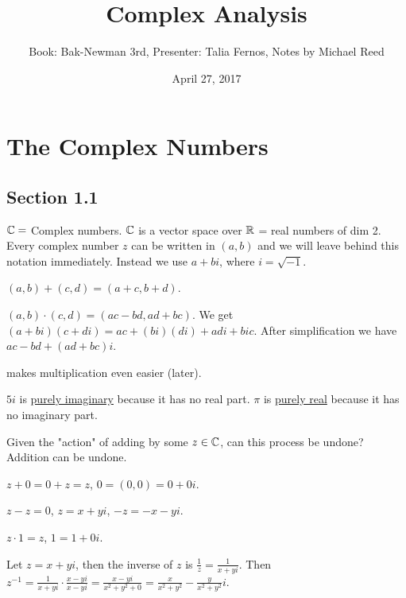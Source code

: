 \documentclass[]{article}
\author{Book: Bak-Newman 3rd, Presenter: Talia Fernos, Notes by Michael Reed}
\title{Complex Analysis}
\date{April 27, 2017}
\begin{document}
\maketitle

\section{The Complex Numbers}
\subsection{Section 1.1}
$\mathbb{C} = $ Complex numbers. $\mathbb{C}$ is a vector space over $\mathbb{R}$ = real numbers of dim 2. Every complex number $z$ can be written in  $(a,b)$ and we will leave behind this notation immediately. Instead we use $a+bi$, where $i=\sqrt{-1}$.
\begin{definition}
	[Addition] $(a,b)+(c,d)=(a+c,b+d)$.
\end{definition}
\begin{definition}
	[Multiplication] $(a,b)\cdot(c,d)=(ac-bd,ad+bc)$. We get $(a+bi)(c+di)=ac+(bi)(di)+adi+bic$. After simplification we have $ac-bd+(ad+bc)i$.
\end{definition}
\begin{definition}
	 makes multiplication even easier (later).
\end{definition}
\begin{example}
	$5i$ is \underline{purely imaginary} because it has no real part. $\pi$ is \underline{purely real} because it has no imaginary part.
\end{example}
\begin{example}
	Given the "action" of adding by some $z\in\mathbb{C}$, can this process be undone? Addition can be undone.%
\end{example}
\begin{definition}
	 $z+0=0+z=z$, $0=(0,0)=0+0i$.
\end{definition}
\begin{definition}
	 $z-z=0$, $z=x+yi$, $-z=-x-yi$.
\end{definition}
\begin{definition}
	 $z\cdot1=z$, $1=1+0i$.
\end{definition}
\begin{definition}
	 Let $z=x+yi$, then the inverse of $z$ is $\frac{1}{z}=\frac{1}{x+yi}$. Then $z^{-1}=\frac{1}{x+yi}\cdot\frac{x-yi}{x-yi}=\frac{x-yi}{x^2+y^2+0}=\frac{x}{x^2+y^2}-\frac{y}{x^2+y^2}i$.
\end{definition}
\end{document}
